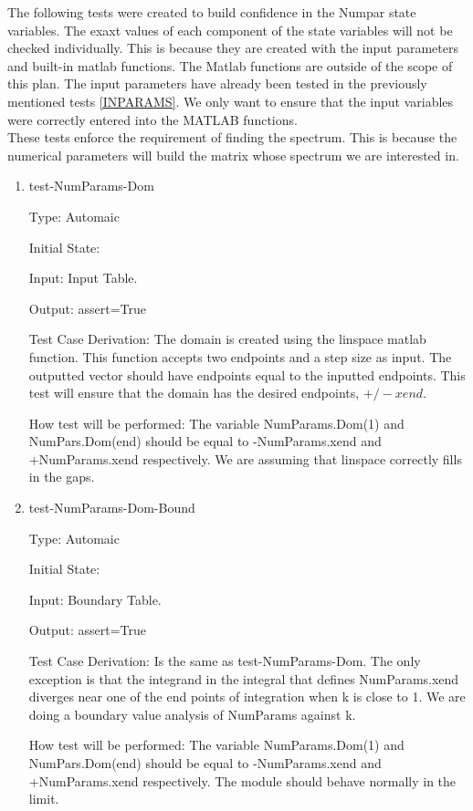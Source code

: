 \documentclass[12pt, titlepage]{article}
\begin{document}
The following tests were created to build confidence in the Numpar state 
variables. The exaxt values of each component of the state variables will not 
be checked individually. This is because they are created with the input 
parameters and built-in matlab functions. The Matlab 
functions are outside of the scope 
of this plan. The input parameters have already been tested in the previously 
mentioned tests \ref{INPARAMS}. We only want to ensure that the input variables 
were correctly entered into the MATLAB functions. \\
These tests enforce the requirement of finding the spectrum. This is because 
the numerical 
parameters will build the matrix whose spectrum we are interested in. \\ 
\begin{enumerate}
\item{test-NumParams-Dom\\}

Type: Automaic

Initial State: 

Input: Input Table. 

Output: assert=True

Test Case Derivation: The domain is created using the linspace matlab function. 
This function accepts two endpoints and a step size as input. The outputted 
vector should have endpoints equal to the inputted endpoints. This test will 
ensure that the domain has the desired endpoints, $+/- xend$. 

How test will be performed: The variable NumParams.Dom(1) and NumPars.Dom(end) 
should be equal to -NumParams.xend and +NumParams.xend respectively. We are 
assuming that linspace correctly fills in the gaps.  

\item{test-NumParams-Dom-Bound\\}

Type: Automaic

Initial State: 

Input: Boundary Table. 

Output: assert=True

Test Case Derivation: Is the same as test-NumParams-Dom. The only exception is 
that the integrand in the integral that defines NumParams.xend diverges near 
one of 
the end points 
of integration when k is close to 1. We are doing a boundary value analysis of 
NumParams against k. 

How test will be performed: The variable NumParams.Dom(1) and NumPars.Dom(end) 
should be equal to -NumParams.xend and +NumParams.xend respectively. The module 
should behave normally in the limit. 


\end{enumerate}
\end{document}
